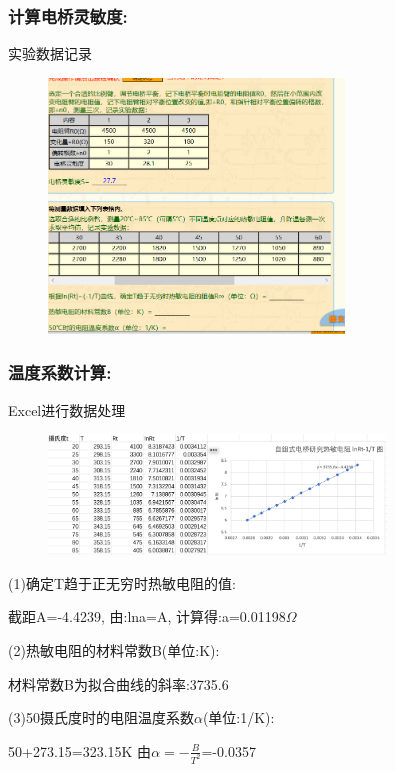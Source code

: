 \documentclass{article}
\begin{document}
\subsubsection*{计算电桥灵敏度:}
实验数据记录
\begin{figure}[H]
    \centering
    \includegraphics[width=0.7\textwidth]{虚拟3/3.png}
\end{figure}

\subsubsection*{温度系数计算:}

Excel进行数据处理
\begin{figure}[H]
    \centering
    \includegraphics[width=0.8\textwidth]{6.png}
\end{figure}

(1)确定T趋于正无穷时热敏电阻的值:

截距A=-4.4239, 由:lna=A,  计算得:a=0.01198$\Omega$

(2)热敏电阻的材料常数B(单位:K):

材料常数B为拟合曲线的斜率:3735.6

(3)50摄氏度时的电阻温度系数$\alpha$(单位:1/K):

50+273.15=323.15K
由$\alpha=-\frac{B}{T^{2}}$=-0.0357
\end{document}

